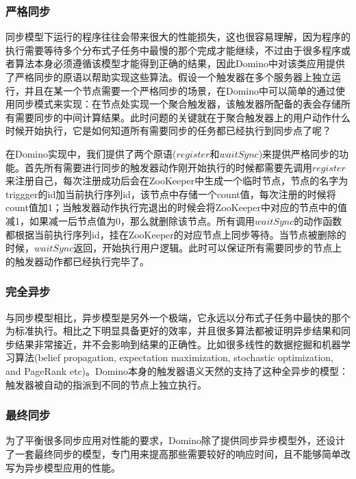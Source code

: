 \subsubsection{严格同步}

同步模型下运行的程序往往会带来很大的性能损失，这也很容易理解，因为程序的执行需要等待多个分布式子任务中最慢的那个完成才能继续，不过由于很多程序或者算法本身必须遵循该模型才能得到正确的结果，因此Domino中对该类应用提供了严格同步的原语以帮助实现这些算法。假设一个触发器在多个服务器上独立运行，并且在某一个节点需要一个严格同步的场景，在Domino中可以简单的通过使用同步模式来实现：在节点处实现一个聚合触发器，该触发器所配备的表会存储所有需要同步的中间计算结果。此时问题的关键就在于聚合触发器上的用户动作什么时候开始执行，它是如何知道所有需要同步的任务都已经执行到同步点了呢？

在Domino实现中，我们提供了两个原语($register$和$waitSync$)来提供严格同步的功能。首先所有需要进行同步的触发器动作刚开始执行的时候都需要先调用$register$来注册自己，每次注册成功后会在ZooKeeper中生成一个临时节点，节点的名字为triggger的id加当前执行序列id，该节点中存储一个count值，每次注册的时候将count值加1；当触发器动作执行完退出的时候会将ZooKeeper中对应的节点中的值减1，如果减一后节点值为0，那么就删除该节点。所有调用$waitSync$的动作函数都根据当前执行序列id，挂在ZooKeeper的对应节点上同步等待。当节点被删除的时候，$waitSync$返回，开始执行用户逻辑。此时可以保证所有需要同步的节点上的触发器动作都已经执行完毕了。


\subsubsection{完全异步}

与同步模型相比，异步模型是另外一个极端，它永远以分布式子任务中最快的那个为标准执行。相比之下明显具备更好的效率，并且很多算法都被证明异步结果和同步结果非常接近，并不会影响到结果的正确性。比如很多线性的数据挖掘和机器学习算法(belief propagation, expectation maximization, stochastic optimization, and PageRank etc)。Domino本身的触发器语义天然的支持了这种全异步的模型：触发器被自动的指派到不同的节点上独立执行。

\subsubsection{最终同步}

为了平衡很多同步应用对性能的要求，Domino除了提供同步异步模型外，还设计了一套最终同步的模型，专门用来提高那些需要较好的响应时间，且不能够简单改写为异步模型应用的性能。

